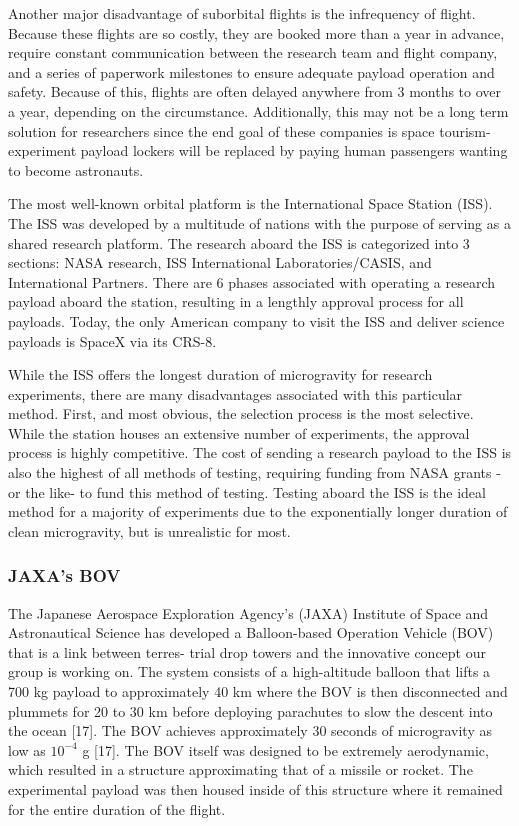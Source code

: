 \indent Another major disadvantage of suborbital flights is the infrequency of flight. Because these flights are so costly, they are booked more than a year in advance, require constant communication between the research team and flight company, and a series of paperwork milestones to ensure adequate payload operation and safety. Because of this, flights are often delayed anywhere from 3 months to over a year, depending on the circumstance. Additionally, this may not be a long term solution for researchers since the end goal of these companies is space tourism- experiment payload lockers will be replaced by paying human passengers wanting to become astronauts.

\indent The most well-known orbital platform is the International Space Station (ISS). The ISS was developed by a multitude of nations with the purpose of serving as a shared research platform. The research aboard the ISS is categorized into 3 sections: NASA research, ISS International Laboratories/CASIS, and International Partners. There are 6 phases associated with operating a research payload aboard the station, resulting in a lengthly approval process for all payloads. Today, the only American company to visit the ISS and deliver science payloads is SpaceX via its CRS-8.

\indent While the ISS offers the longest duration of microgravity for research experiments, there are many disadvantages associated with this particular method. First, and most obvious, the selection process is the most selective. While the station houses an extensive number of experiments, the approval process is highly competitive. The cost of sending a research payload to the ISS is also the highest of all methods of testing, requiring funding from NASA grants -or the like- to fund this method of testing. Testing aboard the ISS is the ideal method for a majority of experiments due to the exponentially longer duration of clean microgravity, but is unrealistic for most.

\subsubsection{JAXA's BOV}

\indent\indent The Japanese Aerospace Exploration Agency’s (JAXA) Institute of Space and Astronautical Science has developed a Balloon-based Operation Vehicle (BOV) that is a link between terres- trial drop towers and the innovative concept our group is working on. The system consists of a high-altitude balloon that lifts a 700 kg payload to approximately 40 km where the BOV is then disconnected and plummets for 20 to 30 km before deploying parachutes to slow the descent into the ocean [17]. The BOV achieves approximately 30 seconds of microgravity as low as $10^{-4}$ g [17]. The BOV itself was designed to be extremely aerodynamic, which resulted in a structure approximating that of a missile or rocket. The experimental payload was then housed inside of this structure where it remained for the entire duration of the flight.

